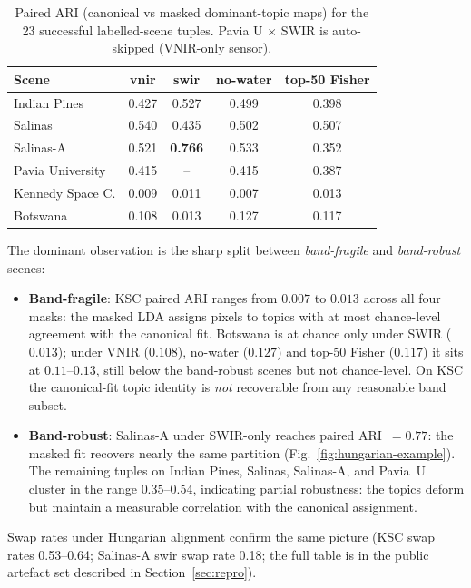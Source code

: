 \documentclass[conference,a4paper,10pt]{IEEEtran}
\begin{document}
\begin{table}[t]
\caption{Paired ARI (canonical vs masked dominant-topic maps) for
the 23 successful labelled-scene tuples. Pavia U $\times$ SWIR is
auto-skipped (VNIR-only sensor).}
\label{tab:paired-ari}
\centering
\small
\begin{tabular}{lcccc}
\toprule
Scene & vnir & swir & no-water & top-50 Fisher \\
\midrule
Indian Pines       & 0.427 & 0.527 & 0.499 & 0.398 \\
Salinas            & 0.540 & 0.435 & 0.502 & 0.507 \\
Salinas-A          & 0.521 & \textbf{0.766} & 0.533 & 0.352 \\
Pavia University   & 0.415 & --    & 0.415 & 0.387 \\
Kennedy Space C.   & 0.009 & 0.011 & 0.007 & 0.013 \\
Botswana           & 0.108 & 0.013 & 0.127 & 0.117 \\
\bottomrule
\end{tabular}
\end{table}

The dominant observation is the sharp split between
\emph{band-fragile} and \emph{band-robust} scenes:

\begin{itemize}
\item \textbf{Band-fragile}: KSC paired ARI ranges from $0.007$ to
$0.013$ across all four masks: the masked LDA assigns
pixels to topics with at most chance-level agreement with the
canonical fit. Botswana is at chance only under SWIR ($0.013$); under
VNIR ($0.108$), no-water ($0.127$) and \mbox{top-50} Fisher ($0.117$) it sits
at $0.11$--$0.13$, still below the band-robust scenes but not
chance-level. On KSC the canonical-fit topic identity is \emph{not}
recoverable from any reasonable band subset.
\item \textbf{Band-robust}: Salinas-A under SWIR-only reaches paired
ARI~$=0.77$: the masked fit recovers nearly the same partition
(Fig.~\ref{fig:hungarian-example}).
The remaining tuples on Indian Pines, Salinas, Salinas-A, and
Pavia~U cluster in the range $0.35$--$0.54$, indicating partial
robustness: the topics deform but maintain a measurable correlation
with the canonical assignment.
\end{itemize}

Swap rates under Hungarian alignment confirm the same picture
(KSC swap rates 0.53--0.64; Salinas-A swir swap rate 0.18; the full
table is in the public artefact set described in
Section~\ref{sec:repro}).
\end{document}
